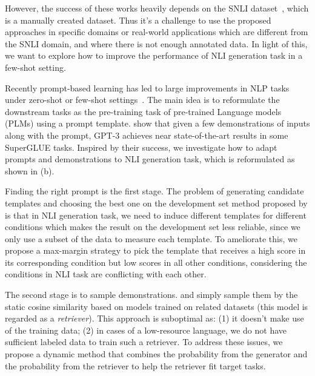 However, the success of these works heavily depends on the 
SNLI dataset~\citep{DBLP:conf/emnlp/BowmanAPM15}, which is a manually created 
dataset. Thus it's a challenge to use the proposed approaches in specific domains or real-world applications which are different from the SNLI domain, 
and where there is not enough annotated data. In light of this, 
we want to explore how to improve the performance of NLI generation task 
in a few-shot setting.

Recently prompt-based learning has led to large improvements in NLP tasks under zero-shot or few-shot settings~\citep{liu2021pre,DBLP:conf/emnlp/PetroniRRLBWM19,DBLP:conf/eacl/SchickS21,DBLP:conf/emnlp/ShinRLWS20}. The main idea is to reformulate the downstream tasks as the pre-training task of pre-trained Language models (PLMs) using a prompt template. \citet{DBLP:conf/nips/BrownMRSKDNSSAA20} show that given a few demonstrations of inputs along with the prompt, GPT-3 achieves near state-of-the-art results in some SuperGLUE tasks.
Inspired by their success, we investigate how to adapt prompts and demonstrations to NLI generation task, which is reformulated as shown in (b).

Finding the right prompt is the first stage. 
The problem of generating candidate templates and choosing the best one on the development set method proposed by \citet{DBLP:conf/acl/GaoFC20} is that in NLI generation task, we need to induce different templates for different conditions which makes the result on the development set less reliable,  
since we only use a subset of the data to measure each template. 
To ameliorate this, we propose a max-margin strategy to pick the template that 
receives a high score in its corresponding condition but low scores 
in all other conditions, considering the conditions in NLI task are conflicting with each other.

The second stage is to sample demonstrations. \citet{DBLP:conf/acl/GaoFC20} and \citet{DBLP:journals/corr/abs-2101-06804} simply sample them by the static cosine similarity based on models trained on related datasets (this model is regarded as a \textit{retriever}). This approach is suboptimal as: 
(1) it doesn't make use of the training data;
(2) in cases of a low-resource language, we 
do not have sufficient labeled data to train such a retriever.
To address these issues, 
we propose a dynamic method that combines 
the probability from the generator and the probability from the retriever to help the retriever fit target tasks.

